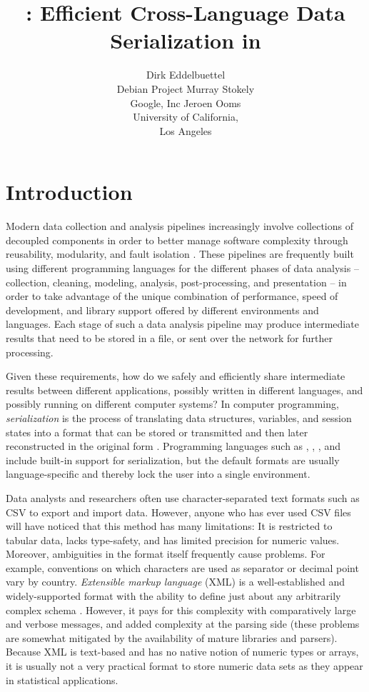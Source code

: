 \documentclass[article]{jss}
\author{Dirk Eddelbuettel\\Debian Project \And 
        Murray Stokely\\Google, Inc \And
        Jeroen Ooms\\University of California,\\Los Angeles}
\title{\pkg{RProtoBuf}: Efficient Cross-Language Data Serialization in \proglang{R}}
\begin{document}
\vspace*{-0.3cm}

\section{Introduction} 

Modern data collection and analysis pipelines increasingly involve collections
of decoupled components in order to better manage software complexity 
through reusability, modularity, and fault isolation \citep{Wegiel:2010:CTT:1932682.1869479}.
These pipelines are frequently built using different programming 
languages for the different phases of data analysis -- collection,
cleaning, modeling, analysis, post-processing, and
presentation -- in order to take advantage of the unique combination of
performance, speed of development, and library support offered by
different environments and languages.  Each stage of such a data
analysis pipeline may produce intermediate results that need to be
stored in a file, or sent over the network for further processing. 

Given these requirements, how do we safely and efficiently share
intermediate results between different applications, possibly written
in different languages, and possibly running on different computer
systems?  In computer programming, \emph{serialization} is the process
of translating data structures, variables, and session states into a
format that can be stored or transmitted and then later reconstructed
in the original form \citep{clinec++}.  Programming languages such as
 \citep{r},  \citep{julia},
, and  \citep{python} include built-in
support for serialization, but the default formats are usually
language-specific and thereby lock the user into a single environment.

Data analysts and researchers often use character-separated text
formats such as CSV \citep{shafranovich2005common} to export
and import data. However, anyone who has ever used CSV files
will have noticed that this method has many limitations: It is
restricted to tabular data, lacks type-safety, and has limited
precision for numeric values.  Moreover, ambiguities in the format
itself frequently cause problems.  For example, conventions on which
characters are used as separator or decimal point vary by country.
\emph{Extensible markup language} (XML) is a well-established
and widely-supported format with the ability to define just about any
arbitrarily complex schema \citep{nolan2013xml}. However, it pays for
this complexity with comparatively large and verbose messages, and
added complexity at the parsing side (these problems are somewhat
mitigated by the availability of mature libraries and
parsers). Because XML is text-based and has no native notion of
numeric types or arrays, it is usually not a very practical format to
store numeric data sets as they appear in statistical applications.
\end{document}
